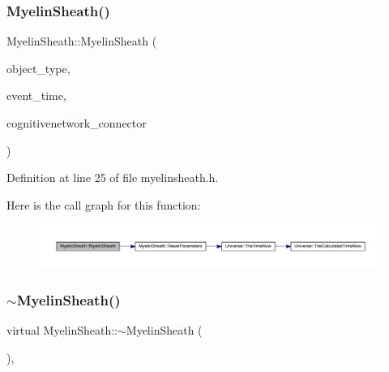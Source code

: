 \subsubsection{\texorpdfstring{Myelin\+Sheath()}{MyelinSheath()}\hspace{0.1cm}{\footnotesize\ttfamily [4/4]}}
{\footnotesize\ttfamily Myelin\+Sheath\+::\+Myelin\+Sheath (\begin{DoxyParamCaption}\item[{unsigned int}]{object\+\_\+type,  }\item[{std\+::chrono\+::time\+\_\+point$<$ \hyperlink{universe_8h_a0ef8d951d1ca5ab3cfaf7ab4c7a6fd80}{Clock} $>$}]{event\+\_\+time,  }\item[{\hyperlink{class_cognitive_network}{Cognitive\+Network} \&}]{cognitivenetwork\+\_\+connector }\end{DoxyParamCaption})\hspace{0.3cm}{\ttfamily [inline]}}



Definition at line 25 of file myelinsheath.\+h.

Here is the call graph for this function\+:
\nopagebreak
\begin{figure}[H]
\begin{center}
\leavevmode
\includegraphics[width=350pt]{class_myelin_sheath_aac107d8f22ca3c02f2d346f44950e6d0_cgraph}
\end{center}
\end{figure}
\mbox{\label{class_myelin_sheath_acf71a2a450e2df353f28eed6c7a4129a}} 
\subsubsection{\texorpdfstring{$\sim$\+Myelin\+Sheath()}{~MyelinSheath()}}
{\footnotesize\ttfamily virtual Myelin\+Sheath\+::$\sim$\+Myelin\+Sheath (\begin{DoxyParamCaption}{ }\end{DoxyParamCaption})\hspace{0.3cm}{\ttfamily [inline]}, {\ttfamily [virtual]}}

